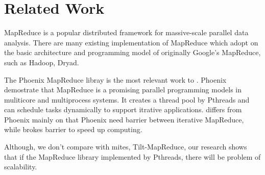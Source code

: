 \section{Related Work}
\label{sec:rel}
MapReduce is a popular distributed framework
for massive-scale parallel data analysis.
There are many existing implementation of MapReduce 
which adopt on the basic architecture and 
programming model of originally Google's MapReduce, 
such as Hadoop\cite{}, Dryad\cite{isard2007dryad}.


The Phoenix MapReduce libray\cite{ranger2007phoenix} 
is the most relevant work to \myds. 
Phoenix demostrate that MapReduce is a promising parallel programming
models in muliticore and multiprocess systems.
It creates a thread pool by Pthreads
and can schedule tasks dynamically to support itrative applications.
\myds differs from Phoenix mainly on that 
Phoenix need barrier between iterative MapReduce,
while \myds brokes barrier to speed up computing.

Although, we don't compare \myds with mites, Tilt-MapReduce,
our research shows that if the MapReduce library implemented by Pthreads, there will be problem of scalability.
